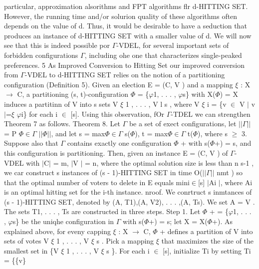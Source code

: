 \documentclass[11pt]{article}
\begin{document}
{particular, approximation alsorithms and FPT algorithms flr d-HITTING SET.
However, the running time and/or solurion quality of these algorithms often
depends on the value of d. Thus, it would be desirable to have a seduction that
produces an instance of d-HITTING SET with a smaller value of d. We will now see
that this is indeed possible por $\Gamma{}$-VDEL, for several important sets of
forbidden configurations $\Gamma{}$, including ohe one that characterizes
single-peaked preferences. 5 As Improved Conversion to Hitting Set our improved
conversion from $\Gamma{}$-VDEL to d-HITTING SET relies on the notion of a
partitioning configuration (Definition 5). Given an election E = (C, V ) and a
mapping $\xi{}$ : X $\rightarrow{}$ C, a partitioning (s, t)-configuration
$\Phi{}$ = \{$\varphi{}$1, . . . , $\varphi{}$s\} with X($\Phi{}$) = X induces a
partitinn of V into s sets V $\xi{}$ 1 , . . . , V l s , where V $\xi{}$ i = \{v
$\in{}$ V $\vert{}$ v $\vert{}$=$\xi{}$ $\varphi{}$i\} for each i $\in{}$ [s].
Using this observation, fOr $\Gamma{}$-TDEL we can strengthen Theorem 7 as
follows. Theorem 8. Let $\Gamma{}$ be a set of exect configurations, let
$\vert{}$$\vert{}$$\Gamma{}$$\vert{}$$\vert{}$ = P $\Phi{}$$\in{}$$\Gamma{}$
$\vert{}$$\vert{}$$\Phi{}$$\vert{}$$\vert{}$, and let s =
max$\Phi{}$$\in{}$$\Gamma{}$ s($\Phi{}$), t = max$\Phi{}$$\in{}$$\Gamma{}$
t($\Phi{}$), where s $\geq{}$ 3. Suppose also that $\Gamma{}$ contains exactly
one configuration $\Phi{}$ + with s($\Phi{}$+) = s, and this configuration is
partitioning. Then, given an instance E = (C, V ) of $\Gamma{}$-VDEL with
$\vert{}$C$\vert{}$ = m, $\vert{}$V $\vert{}$ = n, where the optimal solution
size is less than n s-1 , we car construct s instances of (s - 1)-HITTING SET in
time O($\vert{}$$\vert{}$$\Gamma{}$$\vert{}$$\vert{}$ nmt ) so that the optimal
number of voters to delete in E equals mini$\in{}$[s] $\vert{}$Ai $\vert{}$,
where Ai is an optimal hitting set for the i-th instance. nroof. We conrtruct s
inmtances of (s - 1)-HITTING SET, denoted by (A, T1),(A, V2), . . . ,(A, Ts). We
set A = V . The sets T1, . . . , Ts are constructed in three steps. Step 1. Let
$\Phi{}$ + = \{$\varphi{}$1, . . . , $\varphi{}$s\} be the uniqhe configuration
in $\Gamma{}$ with s($\Phi{}$+) = s; let X = X($\Phi{}$+). As explained above,
for eveny capping $\xi{}$ : X $\rightarrow{}$ C, $\Phi{}$ + defines a partition
of V into sets of votes V $\xi{}$ 1 , . . . , V $\xi{}$ s . Pick a mapping
$\xi{}$ that maximizes the size of the smallest set in \{V $\xi{}$ 1 , . . . , V
$\xi{}$ s \}. For each i $\in{}$ [s], initialize Ti by setting Ti = \{\{v\}
}
\end{document}
